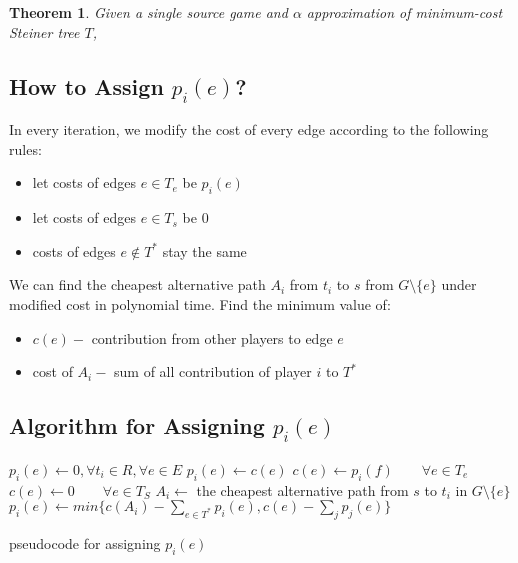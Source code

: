 \documentclass[11pt,psfig,times]{article}
\newtheorem{theorem}{Theorem}[section]
\begin{document}
\begin{theorem}
	Given a single source game and \(\alpha\) approximation of minimum-cost Steiner tree \(T\), 
\end{theorem}

\subsection{How to Assign \(p_i(e)\)?}
In every iteration, we modify the cost of every edge according to the following rules:
	\begin{itemize}
		\item let costs of edges \(e \in T_e\) be \(p_i(e)\)
		\item let costs of edges \(e \in T_s\) be  0
		\item costs of edges \(e\notin T^*\) stay the same
	\end{itemize}
	
	We can find the cheapest alternative path \(A_i\) from \(t_i\) to \(s\) from \(G \setminus \{e\}\) under modified cost in polynomial time. 
		Find the minimum value of:
		\begin{itemize}
			\item $c(e) - $ contribution from other players to edge \(e\)
			\item cost of \(A_i-\) sum of all contribution of player \(i\) to \(T^*\) 
		\end{itemize}
	
	
	\subsection{Algorithm for Assigning $p_i(e)$}
	\begin{algorithm}[H]
	\begin{algorithmic}[1]
		\STATE $p_i(e) \gets 0, \forall t_i \in R, \forall e \in E$ 
		\STATE $p_i(e) \gets c(e)$
		\ELSE
		\STATE \(c(e) \gets p_i(f)  \qquad \forall e \in T_e\) 
		\STATE \(c(e) \gets 0 \qquad \forall e \in T_S\) 
		\STATE $A_i \gets$ the cheapest alternative path from \(s\) to \(t_i\) in $G\setminus\{e\}$ 
		\STATE \(p_i(e) \gets min\{c(A_i) - \sum_{e\in T^*}p_i(e), c(e)-\sum_{j}p_j(e) \}\)
		\ENDIF
		\ENDWHILE
	\end{algorithmic}
	\caption{pseudocode for assigning $p_i(e)$ }
	\label{alg:seq}
	\end{algorithm}
	
	
	
\end{document}
